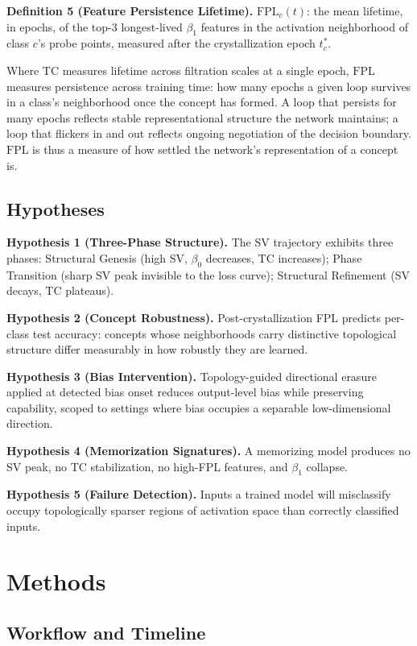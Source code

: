 \documentclass[10pt]{article}
\newcommand{\TC}{\mathrm{TC}}
\newcommand{\FPL}{\mathrm{FPL}}
\begin{document}
\textbf{Definition 5 (Feature Persistence Lifetime).} $\FPL_{c}(t)$: the mean lifetime, in epochs, of the top-3 longest-lived $\beta_1$ features in the activation neighborhood of class $c$'s probe points, measured after the crystallization epoch $t^{*}_{c}$.

Where $\TC$ measures lifetime across filtration scales at a single epoch, $\FPL$ measures persistence across training time: how many epochs a given loop survives in a class's neighborhood once the concept has formed. A loop that persists for many epochs reflects stable representational structure the network maintains; a loop that flickers in and out reflects ongoing negotiation of the decision boundary. $\FPL$ is thus a measure of how settled the network's representation of a concept is.

\subsection{Hypotheses}

\textbf{Hypothesis 1 (Three-Phase Structure).} The SV trajectory exhibits three phases: Structural Genesis (high SV, $\beta_0$ decreases, TC increases); Phase Transition (sharp SV peak invisible to the loss curve); Structural Refinement (SV decays, TC plateaus).

\textbf{Hypothesis 2 (Concept Robustness).} Post-crystallization FPL predicts per-class test accuracy: concepts whose neighborhoods carry distinctive topological structure differ measurably in how robustly they are learned.

\textbf{Hypothesis 3 (Bias Intervention).} Topology-guided directional erasure applied at detected bias onset reduces output-level bias while preserving capability, scoped to settings where bias occupies a separable low-dimensional direction.

\textbf{Hypothesis 4 (Memorization Signatures).} A memorizing model produces no SV peak, no TC stabilization, no high-FPL features, and $\beta_1$ collapse.

\textbf{Hypothesis 5 (Failure Detection).} Inputs a trained model will misclassify occupy topologically sparser regions of activation space than correctly classified inputs.

\section{Methods}

\subsection{Workflow and Timeline}
\end{document}
